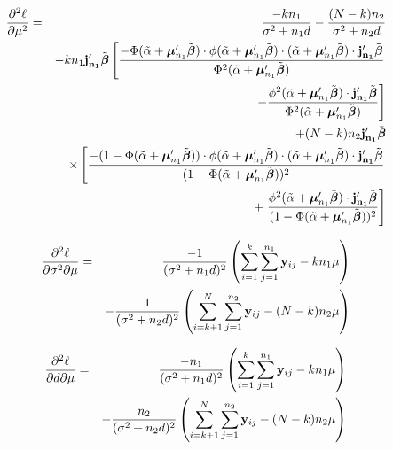 \documentclass[11pt,a5paper,twoside]{book}
\newcommand{\by}{{\bf y}}
\newcommand{\bfbeta}{\mbox{\boldmath $\beta$}}
\newcommand{\bmu}{\mbox{\boldmath $\mu$}}
\begin{document}
{\begin{equation}
\begin{aligned}
\frac{\partial^2\ell}{\partial \mu^2} & = &\frac{-kn_1}{\sigma^2+n_1d}-\frac{(N-k)n_2}{\sigma^2 +n_2d}  \\
&& - kn_1 \mathbf{j_{n_1}'}\tilde{\bfbeta}\left[ \frac{-\Phi(\tilde{\alpha}+\bmu_{n_1}'\tilde{\bfbeta}) \cdot \phi(\tilde{\alpha}+\bmu_{n_1}'\tilde{\bfbeta})\cdot(\tilde{\alpha}+\bmu_{n_1}'\tilde{\bfbeta}) \cdot \mathbf{j_{n_1}'}\tilde{\bfbeta}}{\Phi^2(\tilde{\alpha}+\bmu_{n_1}'\tilde{\bfbeta})} \right.  \\
&& \left. - \frac{\phi^2(\tilde{\alpha}+\bmu_{n_1}'\tilde{\bfbeta}) \cdot \mathbf{j_{n_1}'}\tilde{\bfbeta}}{\Phi^2(\tilde{\alpha}+\bmu_{n_1}'\tilde{\bfbeta})}\right]  \\
&& +(N-k)n_2 \mathbf{j_{n_1}'}\tilde{\bfbeta}\\
&&\times \left[ \frac{-(1-\Phi(\tilde{\alpha}+\bmu_{n_1}'\tilde{\bfbeta})) \cdot \phi(\tilde{\alpha}+\bmu_{n_1}'\tilde{\bfbeta})\cdot(\tilde{\alpha}+\bmu_{n_1}'\tilde{\bfbeta}) \cdot \mathbf{j_{n_1}'}\tilde{\bfbeta}}{(1-\Phi(\tilde{\alpha}+\bmu_{n_1}'\tilde{\bfbeta}))^2} \right.  \\ 
&& + \left. \frac{\phi^2(\tilde{\alpha}+\bmu_{n_1}'\tilde{\bfbeta}) \cdot \mathbf{j_{n_1}'}\tilde{\bfbeta}}{(1-\Phi(\tilde{\alpha}+\bmu_{n_1}'\tilde{\bfbeta}))^2}\right]\label{chessian1}
\end{aligned}
\end{equation}

\begin{equation}
\begin{aligned}
\frac{\partial^2\ell}{\partial \sigma^2 \partial \mu} & = &\frac{-1}{(\sigma^2+n_1d)^2} \left( \sum_{i=1}^k \sum_{j=1}^{n_1} \by_{ij}-k n_1 \mu\right) \\
&& - \frac{1}{(\sigma^2+n_2d)^2} \left( \sum_{i=k+1}^N \sum_{j=1}^{n_2} \by_{ij}-(N-k) n_2 \mu\right) \label{chessian2} 
\end{aligned}
\end{equation}

\begin{equation}
\begin{aligned}
\frac{\partial^2\ell}{\partial d \partial \mu} & =& \frac{-n_1}{(\sigma^2+n_1d)^2} \left( \sum_{i=1}^k \sum_{j=1}^{n_1} \by_{ij}-k n_1 \mu\right) \\
& &- \frac{n_2}{(\sigma^2+n_2d)^2} \left( \sum_{i=k+1}^N \sum_{j=1}^{n_2} \by_{ij}-(N-k) n_2 \mu\right) \label{chessian3}
\end{aligned}
\end{equation}

}
\end{document}
